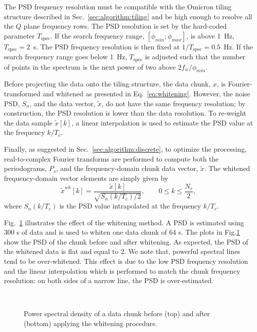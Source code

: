 The PSD frequency resolution must be compatible with the Omicron tiling structure described in Sec.~\ref{sec:algorithm:tiling} and be high enough to resolve all the $Q$ plane frequency rows. The PSD resolution is set by the hard-coded parameter $T_\mathrm{spec}$. If the search frequency range, $[\phi_{min}; \phi_{max}]$, is above 1~Hz, $T_\mathrm{spec}=2$~s. The PSD frequency resolution is then fixed at $1/T_\mathrm{spec}=0.5$~Hz. If the search frequency range goes below 1~Hz, $T_\mathrm{spec}$ is adjusted such that the number of points in the spectrum is the next power of two above $2f_w/\phi_{min}$.

Before projecting the data onto the tiling structure, the data chunk, $x$, is Fourier-transformed and whitened as presented in Eq.~\ref{eq:whitening}. However, the noise PSD, $S_n$, and the data vector, $\tilde{x}$, do not have the same frequency resolution; by construction, the PSD resolution is lower than the data resolution.  To re-weight the data sample $\tilde{x}[k]$, a linear interpolation is used to estimate the PSD value at the frequency $k/T_c$.

Finally, as suggested in Sec.~\ref{sec:algorithm:discrete}, to optimize the processing, real-to-complex Fourier transforms are performed to compute both the periodograms, $P_s$, and the frequency-domain chunk data vector, $\tilde{x}$. The whitened frequency-domain vector elements are simply given by
\begin{equation}
  \tilde{x}^{wh}[k] = \frac{\tilde{x}[k]}{\sqrt{S_n(k/T_c)/2}}, \qquad 0 \le k \le \frac{N_c}{2},
  \label{eq:white_simple}
\end{equation}
where $S_n(k/T_c)$ is the PSD value intrapolated at the frequency $k/T_c$.

Fig.~\ref{fig:white} illustrates the effect of the whitening method. A PSD is estimated using 300 s of data and is used to whiten one data chunk of 64 s. The plots in Fig.\ref{fig:white} show the PSD of the chunk before and after whitening. As expected, the PSD of the whitened data is flat and equal to 2. We note that, powerful spectral lines tend to be over-whitened. This effect is due to the low PSD frequency resolution and the linear interpolation which is performed to match the chunk frequency resolution: on both sides of a narrow line, the PSD is over-estimated.
\begin{figure}
  \center
   \\
  \caption{Power spectral density of a data chunk before (top) and after (bottom) applying the whitening procedure.}
  \label{fig:white}
\end{figure}


